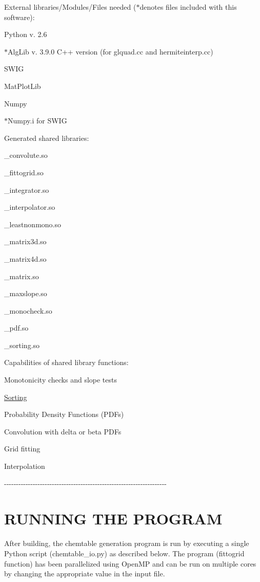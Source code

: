 External libraries/Modules/Files needed ($\ast$denotes files included with this software):
\begin{DoxyItemize}
\item Python v. 2.6
\item $\ast$AlgLib v. 3.9.0 C++ version (for glquad.cc and hermiteinterp.cc)
\item SWIG
\item MatPlotLib
\item Numpy
\item $\ast$Numpy.i for SWIG
\end{DoxyItemize}

Generated shared libraries:
\begin{DoxyItemize}
\item \_\-convolute.so
\item \_\-fittogrid.so
\item \_\-integrator.so
\item \_\-interpolator.so
\item \_\-leastnonmono.so
\item \_\-matrix3d.so
\item \_\-matrix4d.so
\item \_\-matrix.so
\item \_\-maxslope.so
\item \_\-monocheck.so
\item \_\-pdf.so
\item \_\-sorting.so
\end{DoxyItemize}

Capabilities of shared library functions:
\begin{DoxyItemize}
\item Monotonicity checks and slope tests
\item \hyperlink{classSorting}{Sorting}
\item Probability Density Functions (PDFs)
\item Convolution with delta or beta PDFs
\item Grid fitting
\item Interpolation
\end{DoxyItemize}

-\/-\/-\/-\/-\/-\/-\/-\/-\/-\/-\/-\/-\/-\/-\/-\/-\/-\/-\/-\/-\/-\/-\/-\/-\/-\/-\/-\/-\/-\/-\/-\/-\/-\/-\/-\/-\/-\/-\/-\/-\/-\/-\/-\/-\/-\/-\/-\/-\/-\/-\/-\/-\/-\/-\/-\/-\/-\/-\/-\/-\/-\/-\/-\/-\/-\/-\/-\/\hypertarget{index__4_}{}\section{RUNNING THE PROGRAM}\label{index__4_}
After building, the chemtable generation program is run by executing a single Python script (chemtable\_\-io.py) as described below. The program (fittogrid function) has been parallelized using OpenMP and can be run on multiple cores by changing the appropriate value in the input file.

